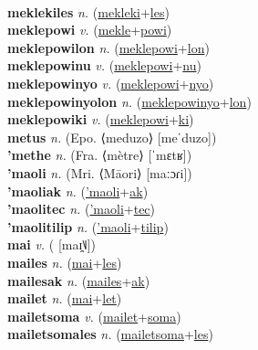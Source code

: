  \label{mekleki} \\
\textbf{meklekiles} \textit{n.} (\hyperref[mekleki]{mekleki}+\hyperref[les]{les})
 \label{meklekiles} \\
\textbf{meklepowi} \textit{v.} (\hyperref[mekle]{mekle}+\hyperref[powi]{powi})
 \label{meklepowi} \\
\textbf{meklepowilon} \textit{n.} (\hyperref[meklepowi]{meklepowi}+\hyperref[lon]{lon})
 \label{meklepowilon} \\
\textbf{meklepowinu} \textit{v.} (\hyperref[meklepowi]{meklepowi}+\hyperref[nu]{nu})
 \label{meklepowinu} \\
\textbf{meklepowinyo} \textit{v.} (\hyperref[meklepowi]{meklepowi}+\hyperref[nyo]{nyo})
 \label{meklepowinyo} \\
\textbf{meklepowinyolon} \textit{n.} (\hyperref[meklepowinyo]{meklepowinyo}+\hyperref[lon]{lon})
 \label{meklepowinyolon} \\
\textbf{meklepowiki} \textit{v.} (\hyperref[meklepowi]{meklepowi}+\hyperref[ki]{ki})
 \label{meklepowiki} \\
\textbf{metus} \textit{n.} (Epo. ⟨meduzo⟩ [meˈduzo])
 \label{metus} \\
\textbf{'methe} \textit{n.} (Fra. ⟨mètre⟩ [ˈmɛtʁ])
 \label{'methe} \\
\textbf{'maoli} \textit{n.} (Mri. ⟨Māori⟩ [maːɔɾi])
 \label{'maoli} \\
\textbf{'maoliak} \textit{n.} (\hyperref['maoli]{'maoli}+\hyperref[ak]{ak})
 \label{'maoliak} \\
\textbf{'maolitec} \textit{n.} (\hyperref['maoli]{'maoli}+\hyperref[tec]{tec})
 \label{'maolitec} \\
\textbf{'maolitilip} \textit{n.} (\hyperref['maoli]{'maoli}+\hyperref[tilip]{tilip})
 \label{'maolitilip} \\
\textbf{mai} \textit{v.} ( [maɪ̯˥˩])
 \label{mai} \\
\textbf{mailes} \textit{n.} (\hyperref[mai]{mai}+\hyperref[les]{les})
 \label{mailes} \\
\textbf{mailesak} \textit{n.} (\hyperref[mailes]{mailes}+\hyperref[ak]{ak})
 \label{mailesak} \\
\textbf{mailet} \textit{n.} (\hyperref[mai]{mai}+\hyperref[let]{let})
 \label{mailet} \\
\textbf{mailetsoma} \textit{v.} (\hyperref[mailet]{mailet}+\hyperref[soma]{soma})
 \label{mailetsoma} \\
\textbf{mailetsomales} \textit{n.} (\hyperref[mailetsoma]{mailetsoma}+\hyperref[les]{les})
